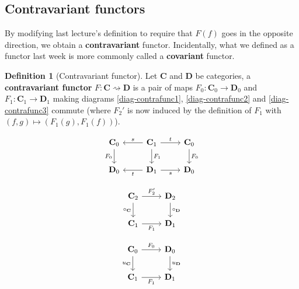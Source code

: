 \documentclass{article}
\theoremstyle{definition}
\newtheorem{defn}[thm]{Definition}
\theoremstyle{remark}
\begin{document}
\subsection{Contravariant functors}
By modifying last lecture's definition to require that $F(f)$ goes in the opposite direction, we obtain a \textbf{contravariant} functor. Incidentally, what we defined as a functor last week is more commonly called a \textbf{covariant} functor.
\begin{defn}[Contravariant functor]
	Let $\mathbf{C}$ and $\mathbf{D}$ be categories, a \textbf{contravariant functor} $F: \mathbf{C} \rightsquigarrow \mathbf{D}$ is a pair of maps $F_0:\mathbf{C}_0 \rightarrow \mathbf{D}_0$ and $F_1:\mathbf{C}_1 \rightarrow \mathbf{D}_1$ making diagrams \eqref{diag-contrafunc1}, \eqref{diag-contrafunc2} and \eqref{diag-contrafunc3} commute (where $F_2'$ is now induced by the definition of $F_1$ with $(f,g) \mapsto (F_1(g), F_1(f))$).\\
	\begin{minipage}{0.37\textwidth}
		\begin{equation}\label{diag-contrafunc1}
		\begin{tikzcd}
		\mathbf{C}_0 \arrow[d, "F_0"'] & \mathbf{C}_1 \arrow[d, "F_1"] \arrow[l, "s"'] \arrow[r, "t"] & \mathbf{C}_0 \arrow[d, "F_0"] \\
		\mathbf{D}_0 & \mathbf{D}_1 \arrow[l, "t"] \arrow[r, "s"'] & \mathbf{D}_0
		\end{tikzcd}
		\end{equation}
	\end{minipage}	
	\begin{minipage}{0.31\textwidth}
		\begin{equation}\label{diag-contrafunc2}
		\begin{tikzcd}
		\mathbf{C}_2 \arrow[d, "\circ_{\mathbf{C}}"'] \arrow[r, "F_2'"] & \mathbf{D}_2 \arrow[d, "\circ_{\mathbf{D}}"] \\
		\mathbf{C}_1 \arrow[r, "F_1"'] & \mathbf{D}_1
		\end{tikzcd}
		\end{equation}
	\end{minipage}
	\begin{minipage}{0.31\textwidth}
		\begin{equation}\label{diag-contrafunc3}
		\begin{tikzcd}
		\mathbf{C}_0 \arrow[d, "u_{\mathbf{C}}"'] \arrow[r, "F_0"] & \mathbf{D}_0 \arrow[d, "u_{\mathbf{D}}"] \\
		\mathbf{C}_1 \arrow[r, "F_1"'] & \mathbf{D}_1

\end{tikzcd}
\end{equation}
\end{minipage}
\end{defn}
\end{document}

